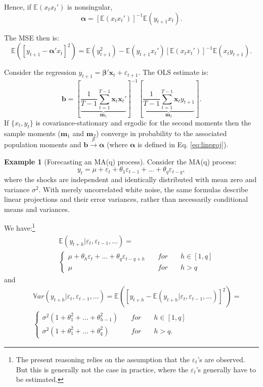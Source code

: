 \documentclass[
  11pt,
]{book}
\theoremstyle{definition}
\theoremstyle{definition}
\newtheorem{example}{Example}[chapter]
\theoremstyle{definition}
\theoremstyle{definition}
\theoremstyle{remark}
\begin{document}
Hence, if \(\mathbb{E}\left(x_tx_t' \right)\) is nonsingular,
\begin{equation}
\boldsymbol\alpha=[\mathbb{E}\left(x_tx_t' \right)]^{-1}\mathbb{E}\left( y_{t+1}x_t \right).\label{eq:linproj}
\end{equation}

The MSE then is:
\[
\mathbb{E}([y_{t+1} - \boldsymbol\alpha'x_t]^2) = \mathbb{E}{(y_{t+1}^2)} - \mathbb{E}\left( y_{t+1}x_t' \right)[\mathbb{E}\left(x_tx_t' \right)]^{-1}\mathbb{E}\left(x_ty_{t+1} \right).
\]

Consider the regression \(y_{t+1} = \boldsymbol\beta'\mathbf{x}_t + \varepsilon_{t+1}\). The OLS estimate is:
\[
\mathbf{b} = \left[ \underbrace{ \frac{1}{T-1} \sum_{t=1}^{T-1} \mathbf{x}_t\mathbf{x}_t'}_{\mathbf{m}_1} \right]^{-1}\left[  \underbrace{ \frac{1}{T-1} \sum_{t=1}^{T-1} \mathbf{x}_t y_{t+1}}_{\mathbf{m}_2} \right].
\]
If \(\{x_t,y_t\}\) is covariance-stationary and ergodic for the second moments then the sample moments (\(\mathbf{m}_1\) and \(\mathbf{m}_2\)) converge in probability to the associated population moments and \(\mathbf{b} \overset{p}{\rightarrow} \boldsymbol\alpha\) (where \(\boldsymbol\alpha\) is defined in Eq. \eqref{eq:linproj}).

\begin{example}[Forecasting an MA(q) process]
\protect\hypertarget{exm:fcstMAq}{}\label{exm:fcstMAq}Consider the MA(q) process:
\[
y_t = \mu + \varepsilon_t + \theta_1 \varepsilon_{t-1} + \dots + \theta_q \varepsilon_{t-q},
\]
where the shocks are independent and identically distributed with mean zero and variance \(\sigma^2\). With merely uncorrelated white noise, the same formulas describe linear projections and their error variances, rather than necessarily conditional means and variances.

We have:\footnote{The present reasoning relies on the assumption that the \(\varepsilon_t\)'s are observed. But this is generally not the case in practice, where the \(\varepsilon_t\)'s generally have to be estimated.}
\begin{eqnarray*}
&&\mathbb{E}(y_{t+h}|\varepsilon_{t},\varepsilon_{t-1},\dots) =\\
&&\left\{
\begin{array}{lll}
\mu + \theta_h \varepsilon_{t} + \dots + \theta_q \varepsilon_{t-q+h}  \quad &for& \quad h \in [1,q]\\
\mu \quad &for& \quad h > q
\end{array}
\right.
\end{eqnarray*}
and
\begin{eqnarray*}
&&\mathbb{V}ar(y_{t+h}|\varepsilon_{t},\varepsilon_{t-1},\dots)= \mathbb{E}\left( [y_{t+h} - \mathbb{E}(y_{t+h}|\varepsilon_{t},\varepsilon_{t-1},\dots)]^2 \right) =\\
&&\left\{
\begin{array}{lll}
\sigma^2(1+\theta_1^2+\dots+\theta_{h-1}^2) \quad &for& \quad h \in [1,q]\\
\sigma^2(1+\theta_1^2+\dots+\theta_q^2) \quad &for& \quad h>q.
\end{array}
\right.
\end{eqnarray*}
\end{example}
\end{document}
